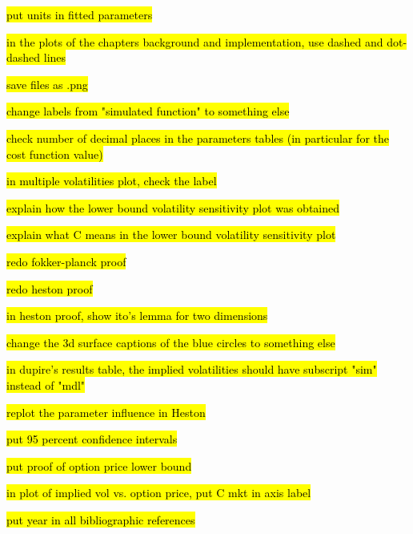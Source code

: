 \hl{put units in fitted parameters}


\hl{in the plots of the chapters background and implementation, use dashed and dot-dashed lines}

\hl{save files as .png}

\hl{change labels from "simulated function" to something else}

\hl{check number of decimal places in the parameters tables (in particular for the cost function value)}

\hl{in multiple volatilities plot, check the label}

\hl{explain how the  lower bound volatility sensitivity plot was obtained}

\hl{explain what C means in the lower bound volatility sensitivity plot}

\hl{redo fokker-planck proof}

\hl{redo heston proof}

\hl{in heston proof, show ito's lemma for two dimensions}

\hl{change the 3d surface captions of the blue circles to something else}

\hl{in dupire's results table, the implied volatilities should have subscript "sim" instead of "mdl"}

\hl{replot the parameter influence in Heston}

\hl{put 95 percent confidence intervals}

\hl{put proof of option price lower bound}

\hl{in plot of implied vol vs. option price, put C mkt in axis label}

\hl{put year in all bibliographic references}